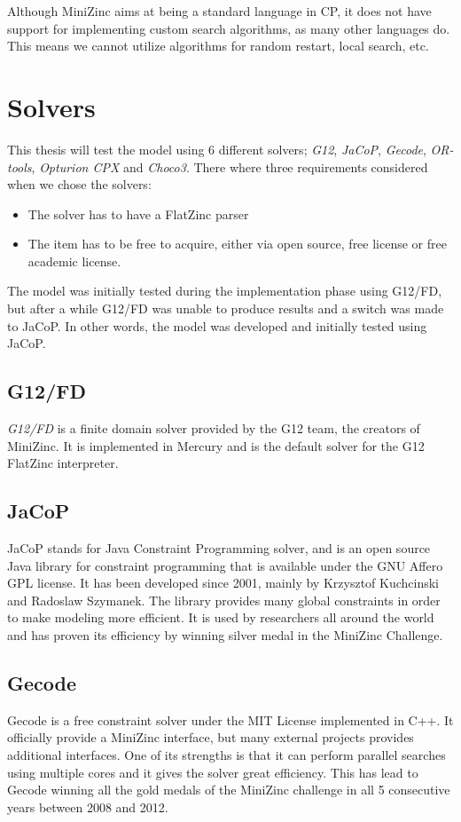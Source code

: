 Although MiniZinc aims at being a standard language in CP, it does not have support for implementing custom search algorithms, as many other languages do. This means we cannot utilize algorithms for random restart, local search, etc.
\cite{mz_paper}

\section{Solvers}
This thesis will test the model using 6 different solvers; \emph{G12}, \emph{JaCoP}, \emph{Gecode}, \emph{OR-tools}, \emph{Opturion CPX} and \emph{Choco3}. There where three requirements considered when we chose the solvers:
\begin{itemize}
\item The solver has to have a FlatZinc parser
\item The item has to be free to acquire, either via open source, free license or free academic license.
\end{itemize}

The model was initially tested during the implementation phase using G12/FD, but after a while G12/FD was unable to produce results and a switch was made to JaCoP. In other words, the model was developed and initially tested using JaCoP.

\subsection{G12/FD}
\emph{G12/FD} is a finite domain solver provided by the G12 team, the creators of MiniZinc. It is implemented in Mercury and is the default solver for the G12 FlatZinc interpreter. \cite{nicta_2964} \cite{mz_result_2014}
\subsection{JaCoP}
JaCoP stands for Java Constraint Programming solver, and is an open source Java library for constraint programming that is available under the GNU Affero GPL license. It has been developed since 2001, mainly by Krzysztof Kuchcinski and Radoslaw Szymanek. The library provides many global constraints in order to make modeling more efficient. It is used by researchers all around the world and has proven its efficiency by winning silver medal in the MiniZinc Challenge.
\cite{jacop_overview}
\cite{jacop_about}
\subsection{Gecode}
Gecode is a free constraint solver under the MIT License implemented in C++. It officially provide a MiniZinc interface, but many external projects provides additional interfaces. One of its strengths is that it can perform parallel searches using multiple cores and it gives the solver great efficiency. This has lead to Gecode winning all the gold medals of the MiniZinc challenge in all 5 consecutive years between 2008 and 2012.
\cite{gecode}

